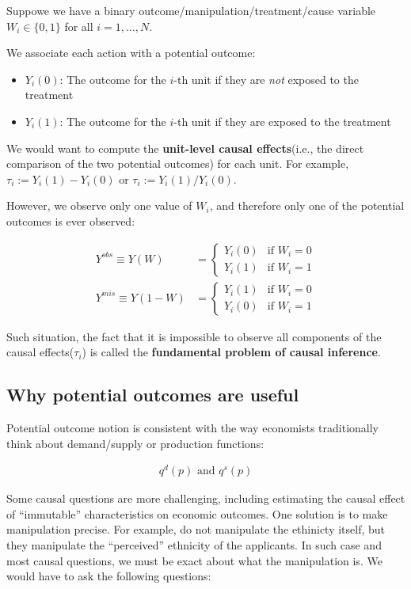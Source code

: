 Suppowe we have a binary outcome/manipulation/treatment/cause variable $W_i \in \{0, 1\}$ for all $i=1, \ldots, N$.

We associate each action with a potential outcome:
\begin{itemize}
    \item $Y_i(0)$: The outcome for the $i$-th unit if they are \textit{not} exposed to the treatment
    \item $Y_i(1)$: The outcome for the $i$-th unit if they are exposed to the treatment
\end{itemize}

We would want to compute the \textbf{unit-level causal effects}(i.e., the direct comparison of the two potential outcomes) for each unit.
For example, $\tau_i:= Y_i(1) - Y_i(0)$ or $\tau_i:= Y_i(1) / Y_i(0)$.

However, we observe only one value of $W_i$, and therefore only one of the potential outcomes is ever observed:

\begin{align}
Y^{obs} \equiv Y(W) &= \begin{cases}
    Y_i(0) & \text{if } W_i = 0 \\
    Y_i(1) & \text{if } W_i = 1
\end{cases}\\
Y^{mis} \equiv Y(1-W) &= \begin{cases}
    Y_i(1) & \text{if } W_i = 0 \\
    Y_i(0) & \text{if } W_i = 1
\end{cases}
\end{align}

Such situation, the fact that it is impossible to observe all components of the causal effects($\tau_i$) is called the \textbf{fundamental problem of causal inference}.


\subsection{Why potential outcomes are useful}

Potential outcome notion is consistent with the way economists traditionally think about demand/supply or production functions:

\begin{align*}
    q^d(p)\text{ and } q^s(p)
\end{align*}

Some causal questions are more challenging, including estimating the causal effect of ``immutable'' characteristics on economic outcomes. One solution is to make manipulation precise.
For example, \textcite{bertrand2004emily} do not manipulate the ethinicty itself, but they manipulate the ``perceived'' ethnicity of the applicants.
In such case and most causal questions, we must be exact about what the manipulation is.
We would have to ask the following questions:


